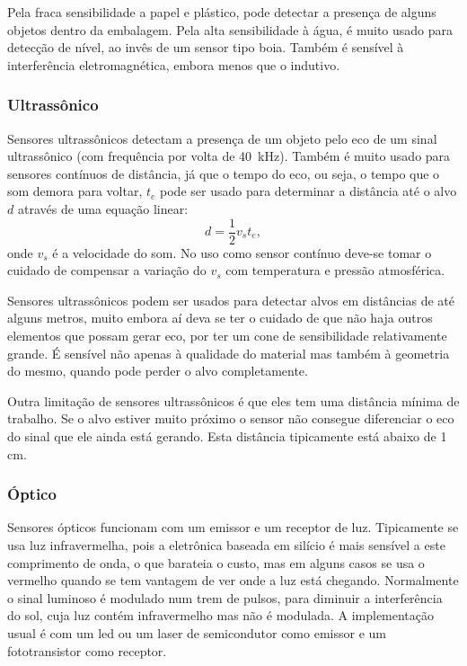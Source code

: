 Pela fraca sensibilidade a papel e plástico, pode detectar a presença de alguns objetos dentro da embalagem. Pela alta sensibilidade à água, é muito usado para detecção de nível, ao invês de um sensor tipo boia. Também é sensível à interferência eletromagnética, embora menos que o indutivo.

\subsubsection{Ultrassônico}
\label{subs:Ultrassonico}

Sensores ultrassônicos detectam a presença de um objeto pelo eco de um sinal ultrassônico (com frequência por volta de \SI{40}{kHz}). Também é muito usado para sensores contínuos de distância, já que o tempo do eco, ou seja, o tempo que o som demora para voltar, $t_e$ pode ser usado para determinar a distância até o alvo $d$ através de uma equação linear:
\begin{equation}
  d = \frac{1}{2}v_s t_e,
\end{equation}
onde $v_s$ é a velocidade do som. No uso como sensor contínuo deve-se tomar o cuidado de compensar a variação do $v_s$ com temperatura e pressão atmosférica.

Sensores ultrassônicos podem ser usados para detectar alvos em distâncias de até alguns metros, muito embora aí deva se ter o cuidado de que não haja outros elementos que possam gerar eco, por ter um cone de sensibilidade relativamente grande. É sensível não apenas à qualidade do material mas também à geometria do mesmo, quando pode perder o alvo completamente.

Outra limitação de sensores ultrassônicos é que eles tem uma distância mínima de trabalho. Se o alvo estiver muito próximo o sensor não consegue diferenciar o eco do sinal que ele ainda está gerando. Esta distância tipicamente está abaixo de 1 cm.

\subsubsection{Óptico}
\label{subs:optico}

Sensores ópticos funcionam com um emissor e um receptor de luz. Tipicamente se usa luz infravermelha, pois a eletrônica baseada em silício é mais sensível a este comprimento de onda, o que barateia o custo, mas em alguns casos se usa o vermelho quando se tem vantagem de ver onde a luz está chegando. Normalmente o sinal luminoso é modulado num trem de pulsos, para diminuir a interferência do sol, cuja luz contém infravermelho mas não é modulada. A implementação usual é com um led ou um laser de semicondutor como emissor e um fototransistor como receptor.

